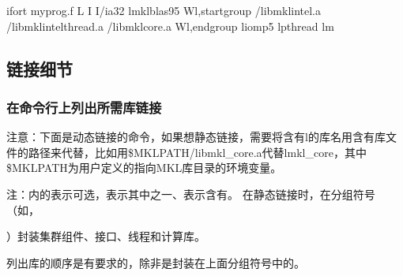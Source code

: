 \documentclass[a4paper,12pt,english]{sphinxmanual}
\begin{document}
\begin{sphinxVerbatim}[commandchars=\\\{\}]
ifort myprog.f \PYGZhy{}L \PYGZhy{}I \PYGZhy{}I/ia32 \PYGZhy{}lmkl\PYGZus{}blas95 
\PYGZhy{}Wl,\PYGZhy{}\PYGZhy{}start\PYGZhy{}group /libmkl\PYGZus{}intel.a /libmkl\PYGZus{}intel\PYGZus{}thread.a 
/libmkl\PYGZus{}core.a \PYGZhy{}Wl,\PYGZhy{}\PYGZhy{}end\PYGZhy{}group \PYGZhy{}liomp5 \PYGZhy{}lpthread \PYGZhy{}lm
\end{sphinxVerbatim}


\subsection{链接细节}
\label{\detokenize{intel-mkl/intel-mkl:id12}}

\subsubsection{在命令行上列出所需库链接}
\label{\detokenize{intel-mkl/intel-mkl:id13}}
\sphinxAtStartPar
注意：下面是动态链接的命令，如果想静态链接，需要将含有\sphinxhyphen{}l的库名用含有库文件的路径来代替，比如用\$MKLPATH/libmkl\_core.a代替\sphinxhyphen{}lmkl\_core，其中\$MKLPATH为用户定义的指向MKL库目录的环境变量。

\begin{DUlineblock}{0em}
\item[] 注：\sphinxcode{\sphinxupquote{{[}{]}}}内的表示可选，\sphinxcode{\sphinxupquote{|}}表示其中之一、\sphinxcode{\sphinxupquote{\{\}}}表示含有。
在静态链接时，在分组符号（如，
\item[] 
\item[] ）封装集群组件、接口、线程和计算库。
\end{DUlineblock}

\sphinxAtStartPar
列出库的顺序是有要求的，除非是封装在上面分组符号中的。
\end{document}
